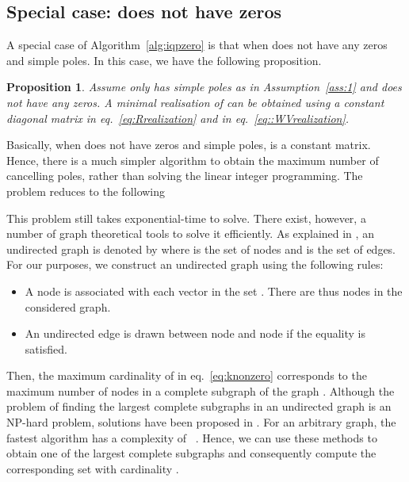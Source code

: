 \documentclass[twocolumn,12pt]{autart}
\theoremstyle{plain}
\newtheorem{proposition}{Proposition}
\begin{document}
\subsection{Special case:   does not have zeros}\label{sec:special}
A special case of Algorithm~\ref{alg:iqpzero} is that when  does not have any zeros and simple poles. In this case, we have the following proposition. 
\begin{proposition}\label{prop:d}\cite{yetac}
Assume  only has simple poles as in Assumption~\ref{ass:1} and does not have any zeros. A minimal realisation of 
can be obtained using a constant diagonal matrix  in eq.~\eqref{eq:Rrealization} and in eq.~\eqref{eq::WVrealization}.\end{proposition}

Basically, when  does not have zeros and simple poles,  is a constant matrix. Hence, there is a much simpler algorithm to obtain the maximum number of cancelling poles, rather than solving the linear integer programming. The problem reduces to the following

This problem still takes exponential-time to solve. There exist, however, a number of graph theoretical tools to solve it efficiently. As explained in \cite{GA}, an undirected graph is
denoted by 
where  is the set
of nodes and  is the set of edges. For our purposes, we construct an undirected graph  using the following rules:
\begin{itemize}
\item A node is associated with each vector in the set . There are thus  nodes in the considered graph. \item An undirected edge  is drawn between node  and node  if the equality  is satisfied.
\end{itemize}
Then, the maximum cardinality of  in eq.~\eqref{eq:knonzero} corresponds to the maximum number of nodes in a complete
subgraph  of the graph . Although the problem of finding the largest complete subgraphs in an undirected graph is an NP-hard problem, solutions have been proposed in \cite{link}. For an arbitrary graph, the fastest algorithm has a complexity of ~\cite{rob}. Hence, we can use these methods to obtain one of the largest complete subgraphs and consequently compute the corresponding set  with cardinality . 
\end{document}
